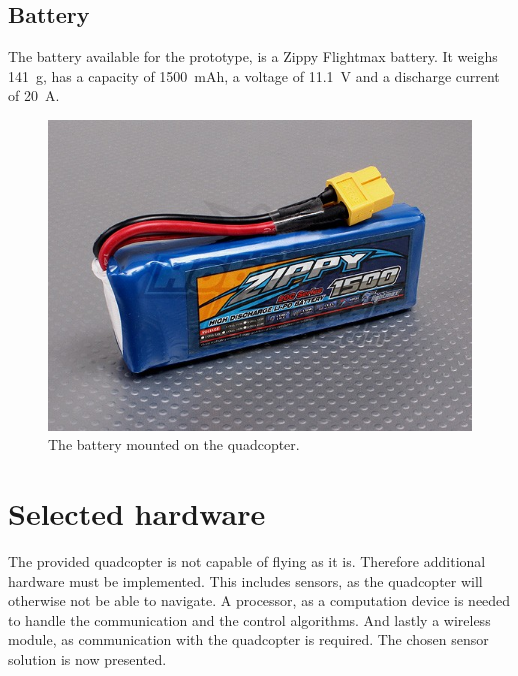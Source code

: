 \subsection{Battery}
The battery available for the prototype, is a Zippy Flightmax battery. It weighs \SI{141}{g}, has a capacity of \SI{1500}{mAh}, a voltage of \SI{11.1}{V} and a discharge current of \SI{20}{A}.\cite{HKingBattery}
%
\begin{figure}[H]
	\centering
	\includegraphics[scale=0.4]{figures/battery}
	\caption{The battery mounted on the quadcopter.\cite{HKingBattery} }
	\label{fig:battery}
\end{figure}

\section{Selected hardware}
The provided quadcopter is not capable of flying as it is. Therefore additional hardware must be implemented. This includes sensors, as the quadcopter will otherwise not be able to navigate. A processor, as a computation device is needed to handle the communication and the control algorithms. And lastly a wireless module, as communication with the quadcopter is required. The chosen sensor solution is now presented.

